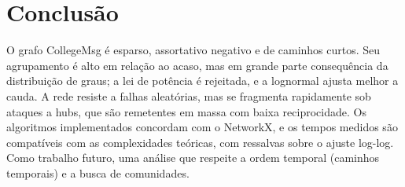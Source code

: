 \documentclass[sigconf]{webmedia}
\begin{document}
\FloatBarrier
\section{Conclusão}
O grafo CollegeMsg é esparso, assortativo negativo e de caminhos curtos. Seu agrupamento é alto em relação ao acaso, mas em grande parte consequência da distribuição de graus; a lei de potência é rejeitada, e a lognormal ajusta melhor a cauda. A rede resiste a falhas aleatórias, mas se fragmenta rapidamente sob ataques a hubs, que são remetentes em massa com baixa reciprocidade. Os algoritmos implementados concordam com o NetworkX, e os tempos medidos são compatíveis com as complexidades teóricas, com ressalvas sobre o ajuste log-log. Como trabalho futuro, uma análise que respeite a ordem temporal (caminhos temporais) e a busca de comunidades.


\FloatBarrier


\end{document}
